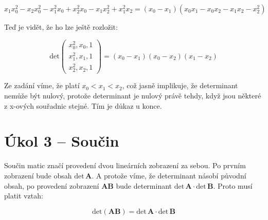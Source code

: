 \documentclass{fkssolpub}
\begin{document}
\[
  x_1 x_0^2 - x_2 x_0^2 - x_1^2 x_0 + x_2^2 x_0 - x_1 x_2^2 + x_1^2 x_2
   = (x_0 - x_1)(x_0 x_1 - x_0 x_2 - x_1 x_2 - x_2^2)
\]

Teď je vidět, že ho lze ještě rozložit:

\[
  \text{det} \begin{pmatrix}
    x_0^2, x_0, 1 \\ x_1^2, x_1, 1 \\ x_2^2, x_2, 1
  \end{pmatrix} = (x_0 - x_1)(x_0 - x_2)(x_1 - x_2)
\]

Ze zadání víme, že platí $x_0 < x_1 < x_2$, což jasně implikuje, že determinant
nemůže být nulový, protože determinant je nulový právě tehdy, když jsou některé
z x-ových souřadnic stejné. Tím je důkaz u konce.

\section{Úkol 3 -- Součin}

Součin matic značí provedení dvou lineárních zobrazení za sebou. Po
prvním zobrazení bude obsah $\text{det} \, \mathbf{A}$. A protože
víme, že determinant násobí původní obsah, po provedení zobrazení
$\mathbf{A} \mathbf{B}$ bude determinant $\text{det} \, \mathbf{A} 
\cdot \text{det} \, \mathbf{B}$. Proto musí platit vztah:

\[
  \text{det}(\mathbf{AB}) = \text{det} \, \mathbf{A} \cdot \text{det} \, \mathbf{B}
\]
\end{document}
